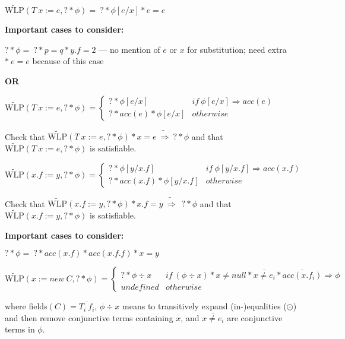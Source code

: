\documentclass {article}
\newcommand{\eif}[3]{if \ ( #1 ) \ \{ #2 \} \ else \ \{#3\}}
\newcommand{\imp}{\Rightarrow}
\newcommand{\timp}{\ \widetilde{\Rightarrow}\ }
\newcommand{\twlp}[2]{\widetilde{\text{WLP}}(#1,#2)}
\begin{document}
\vspace{0.5cm}

$\twlp{T \ x := e}{? \ast \phi} = \ ? \ast \phi[e/x] \ast e = e$

\textbf{Important cases to consider:}

$? \ast \phi = \ ? \ast p = q \ast y.f = 2$ --- no mention of $e$ or $x$ for substitution; need extra $\ast \ e = e$ because of this case

\textbf{OR}

$\twlp{T \ x := e}{? \ast \phi} =
	 \begin{cases}
	 ? \ast \phi[e/x] & if \ \phi[e/x] \imp acc(e) \\
	 ? \ast acc(e) \ast \phi[e/x] & otherwise
	\end{cases}$
	
Check that $\twlp{T \ x := e}{? \ast \phi} \ast x = e \timp ? \ast \phi$ and that $\twlp{T \ x := e}{? \ast \phi}$ is satisfiable.

\vspace{0.5cm}

%

$\twlp{x.f := y}{? \ast \phi} =
	\begin{cases}
	 ? \ast \phi[y/x.f] & if \ \phi[y/x.f] \imp acc(x.f) \\
	 ? \ast acc(x.f) \ast \phi[y/x.f] & otherwise
	\end{cases}$

Check that $\twlp{x.f := y}{? \ast \phi} \ast x.f = y \timp \ ? \ast \phi$ and that $\twlp{x.f := y}{? \ast \phi}$ is satisfiable.

\textbf{Important cases to consider:}

$? \ast \phi = \ ? \ast acc(x.f) \ast acc(x.f.f) \ast x = y $

\vspace{0.5cm}

$\twlp{x := new\ C}{? \ast \phi} = 
	\begin{cases}
	 ? \ast \phi \div x & if \ (\phi \div x) \ast x \neq null \ast \overline{x \neq e_i} \ast \overline{acc(x.f_i)} \imp \phi \\
	 undefined & otherwise
	\end{cases}$ 

where fields$(C) = \overline{T_i \ f_i}$, $\phi \div x$ means to transitively expand (in-)equalities ($\odot$) and then remove conjunctive terms containing $x$, and $\overline{x \neq e_i}$ are conjunctive terms in $\phi$. 
\end{document}
